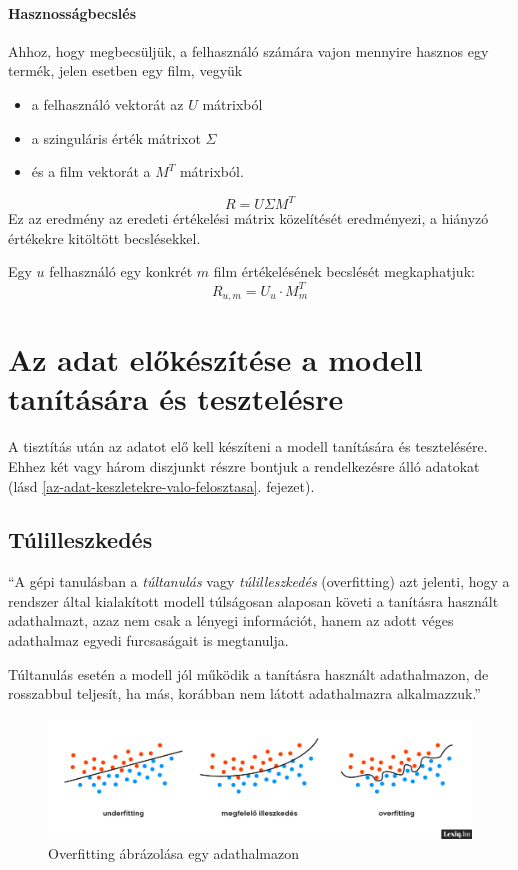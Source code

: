 \documentclass[
]{thesis-ekf}
\theoremstyle{definition}
\theoremstyle{remark}
\begin{document}
\paragraph{Hasznosságbecslés}
Ahhoz, hogy megbecsüljük, a felhasználó számára vajon mennyire hasznos egy termék, jelen esetben egy film, vegyük
\begin{itemize}
	\item a felhasználó vektorát az $U$ mátrixból
	\item a szinguláris érték mátrixot $\Sigma$
	\item és a film vektorát a $M^{T}$ mátrixból.
\end{itemize}

\[ R = U \Sigma M^{T} \]
Ez az eredmény az eredeti értékelési mátrix közelítését eredményezi, a hiányzó értékekre kitöltött becslésekkel.

Egy $u$ felhasználó egy konkrét $m$ film értékelésének becslését megkaphatjuk:
\[ R_{u,m} = U_{u} \cdot M^{T}_{m} \]

\section{Az adat előkészítése a modell tanítására és tesztelésre}
\label{sec-adat-elokeszitese}
A tisztítás után az adatot elő kell készíteni a modell tanítására és tesztelésére. Ehhez két vagy három diszjunkt részre bontjuk a rendelkezésre álló adatokat (lásd \ref{az-adat-keszletekre-valo-felosztasa}. fejezet).

\subsection{Túlilleszkedés}
\label{sec-tulilleszkedes}
``A gépi tanulásban a \emph{túltanulás} vagy \emph{túlilleszkedés} (overfitting) azt jelenti, hogy a rendszer által kialakított modell túlságosan alaposan követi a tanításra használt adathalmazt, azaz nem csak a lényegi információt, hanem az adott véges adathalmaz egyedi furcsaságait is megtanulja.

Túltanulás esetén a modell jól működik a tanításra használt adathalmazon, de rosszabbul teljesít, ha más, korábban nem látott adathalmazra alkalmazzuk.''\cite{overfitting}

\begin{figure}[H]
	\centering
	\includegraphics[width=12cm]{images/overfitting-abrazolasa.png}
	\caption{Overfitting ábrázolása egy adathalmazon\cite{overfitting}}
\end{figure}
\end{document}
